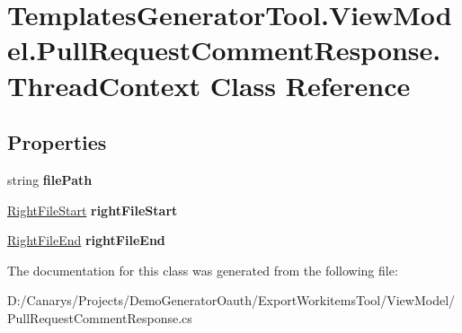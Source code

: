 \hypertarget{class_templates_generator_tool_1_1_view_model_1_1_pull_request_comment_response_1_1_thread_context}{}\section{Templates\+Generator\+Tool.\+View\+Model.\+Pull\+Request\+Comment\+Response.\+Thread\+Context Class Reference}
\label{class_templates_generator_tool_1_1_view_model_1_1_pull_request_comment_response_1_1_thread_context}
\subsection*{Properties}
\begin{DoxyCompactItemize}
\item 
\mbox{\label{class_templates_generator_tool_1_1_view_model_1_1_pull_request_comment_response_1_1_thread_context_a306f47d778ca771fc6a345763f0fcf10}} 
string {\bfseries file\+Path}
\item 
\mbox{\label{class_templates_generator_tool_1_1_view_model_1_1_pull_request_comment_response_1_1_thread_context_a660916f856155807525ed2d5ec9db0ff}} 
\mbox{\hyperlink{class_templates_generator_tool_1_1_view_model_1_1_pull_request_comment_response_1_1_right_file_start}{Right\+File\+Start}} {\bfseries right\+File\+Start}
\item 
\mbox{\label{class_templates_generator_tool_1_1_view_model_1_1_pull_request_comment_response_1_1_thread_context_afa1e0ff08cb40124675dba9cb9b7478f}} 
\mbox{\hyperlink{class_templates_generator_tool_1_1_view_model_1_1_pull_request_comment_response_1_1_right_file_end}{Right\+File\+End}} {\bfseries right\+File\+End}
\end{DoxyCompactItemize}


The documentation for this class was generated from the following file\+:\begin{DoxyCompactItemize}
\item 
D\+:/\+Canarys/\+Projects/\+Demo\+Generator\+Oauth/\+Export\+Workitems\+Tool/\+View\+Model/Pull\+Request\+Comment\+Response.\+cs\end{DoxyCompactItemize}
